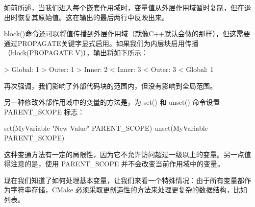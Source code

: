 如前所述，当我们进入每个嵌套作用域时，变量值从外层作用域暂时复制，但在退出时恢复其原始值。这在输出的最后两行中反映出来。

block()命令还可以将值传播到外层作用域（就像C++默认会做的那样），但这需要通过PROPAGATE关键字显式启用。如果我们为内层块启用传播（block(PROPAGATE V)），输出将如下所示：

\begin{shell}
> Global: 1
  > Outer: 1
    > Inner: 2
    < Inner: 3
  < Outer: 3
< Global: 1
\end{shell}

再次强调，我们影响了外部代码块的范围内，但没有影响到全局范围。

另一种修改外部作用域中的变量的方法是，为 set() 和 unset() 命令设置 PARENT\_SCOPE 标志：

\begin{cmake}
set(MyVariable "New Value" PARENT_SCOPE)
unset(MyVariable PARENT_SCOPE)
\end{cmake}

这种变通方法有一定的局限性，因为它不允许访问超过一级以上的变量。另一点值得注意的是，使用 PARENT\_SCOPE 并不会改变当前作用域中的变量。

现在我们知道了如何处理基本变量，让我们来看一个特殊情况：由于所有变量都作为字符串存储，CMake 必须采取更创造性的方法来处理更复杂的数据结构，比如列表。











































